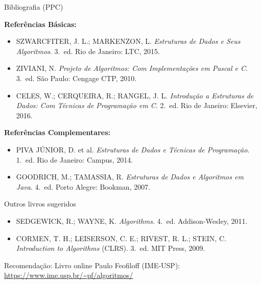 \documentclass[aspectratio=169]{beamer}
\begin{document}
\begin{frame}[shrink]{Bibliografia (PPC)}

  \textbf{Referências Básicas:}
  \begin{itemize}
    \item SZWARCFITER, J. L.; MARKENZON, L. \textit{Estruturas de Dados e Seus Algoritmos}. 3.~ed. Rio de Janeiro: LTC, 2015.
    \item ZIVIANI, N. \textit{Projeto de Algoritmos: Com Implementações em Pascal e C}. 3.~ed. São Paulo: Cengage CTP, 2010.
    \item CELES, W.; CERQUEIRA, R.; RANGEL, J. L. \textit{Introdução a Estruturas de Dados: Com Técnicas de Programação em C}. 2.~ed. Rio de Janeiro: Elsevier, 2016.
  \end{itemize}

  \textbf{Referências Complementares:}
  \begin{itemize}
    \item PIVA JÚNIOR, D. et al. \textit{Estruturas de Dados e Técnicas de Programação}. 1.~ed. Rio de Janeiro: Campus, 2014.
    \item GOODRICH, M.; TAMASSIA, R. \textit{Estruturas de Dados e Algoritmos em Java}. 4.~ed. Porto Alegre: Bookman, 2007.
  \end{itemize}



\end{frame}

\begin{frame}[shrink]{Outros livros sugeridos}
	\begin{itemize}
		\item SEDGEWICK, R.; WAYNE, K. \textit{Algorithms}. 4.~ed. Addison-Wesley, 2011.
		\item CORMEN, T. H.; LEISERSON, C. E.; RIVEST, R. L.; STEIN, C. \textit{Introduction to Algorithms} (CLRS). 3.~ed. MIT Press, 2009.
	\end{itemize}

	\begin{block}{Recomendação: Livro online}
		Paulo Feofiloff (IME-USP): \url{https://www.ime.usp.br/~pf/algoritmos/}
	\end{block}
\end{frame}
\end{document}
